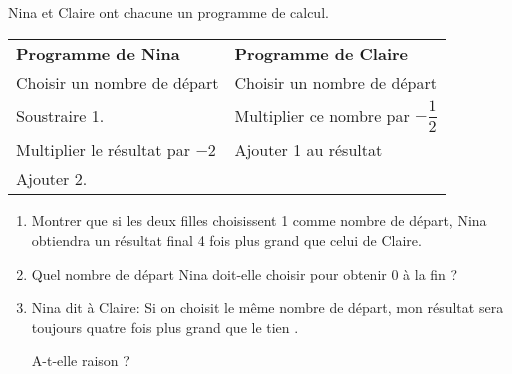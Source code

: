 \documentclass[openany]{book}
\begin{document}
Nina et Claire ont chacune un programme de calcul.

\begin{center}
\begin{tabularx}{\linewidth}{|X|X|}\hline
\textbf{Programme de Nina}&\textbf{Programme de Claire}\\
Choisir un nombre de départ&Choisir un nombre de départ\\
Soustraire 1.&Multiplier ce nombre par $- \dfrac{1}{2}$\\
Multiplier le résultat par $-2$&Ajouter 1 au résultat\\
Ajouter 2.&\\ \hline
\end{tabularx}
\end{center}
\smallskip

\begin{enumerate}
\item Montrer que si les deux filles choisissent 1 comme nombre de départ, Nina
obtiendra un résultat final 4 fois plus grand que celui de Claire.
\item  Quel nombre de départ Nina doit-elle choisir pour obtenir $0$ à la fin ?
\item  Nina dit à Claire: \og Si on choisit le même nombre de départ, mon résultat sera
toujours quatre fois plus grand que le tien \fg.

A-t-elle raison ?
\end{enumerate}
\end{document}
